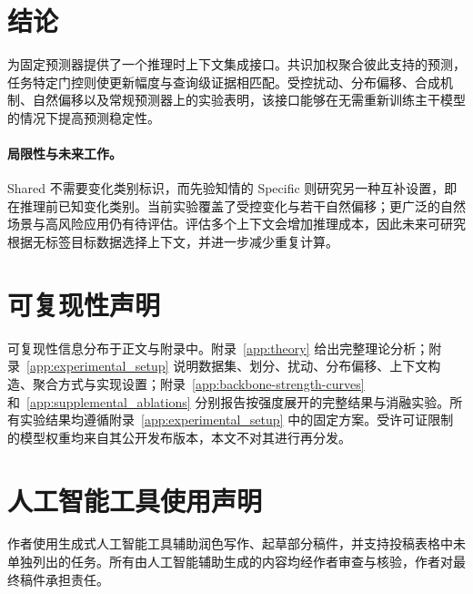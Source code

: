 \section{结论}
\label{sec:conclusion}

\method{} 为固定预测器提供了一个推理时上下文集成接口。共识加权聚合彼此支持的预测，任务特定门控则使更新幅度与查询级证据相匹配。受控扰动、分布偏移、合成机制、自然偏移以及常规预测器上的实验表明，该接口能够在无需重新训练主干模型的情况下提高预测稳定性。

\paragraph{局限性与未来工作。}
Shared 不需要变化类别标识，而先验知情的 Specific 则研究另一种互补设置，即在推理前已知变化类别。当前实验覆盖了受控变化与若干自然偏移；更广泛的自然场景与高风险应用仍有待评估。评估多个上下文会增加推理成本，因此未来可研究根据无标签目标数据选择上下文，并进一步减少重复计算。

\section*{可复现性声明}

可复现性信息分布于正文与附录中。附录~\ref{app:theory} 给出完整理论分析；附录~\ref{app:experimental_setup} 说明数据集、划分、扰动、分布偏移、上下文构造、聚合方式与实现设置；附录~\ref{app:backbone-strength-curves} 和~\ref{app:supplemental_ablations} 分别报告按强度展开的完整结果与消融实验。所有实验结果均遵循附录~\ref{app:experimental_setup} 中的固定方案。受许可证限制的模型权重均来自其公开发布版本，本文不对其进行再分发。

\section*{人工智能工具使用声明}

作者使用生成式人工智能工具辅助润色写作、起草部分稿件，并支持投稿表格中未单独列出的任务。所有由人工智能辅助生成的内容均经作者审查与核验，作者对最终稿件承担责任。
